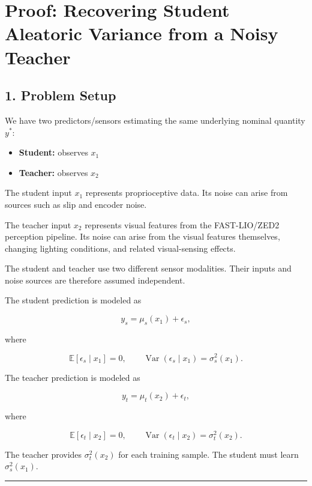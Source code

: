 \section{Proof: Recovering Student Aleatoric Variance from a Noisy
Teacher}\label{proof-recovering-student-aleatoric-variance-from-a-noisy-teacher}

\subsection{1. Problem Setup}\label{problem-setup}

We have two predictors/sensors estimating the same underlying nominal
quantity \(y^*\):

\begin{itemize}
\tightlist
\item
  \textbf{Student:} observes \(x_1\)
\item
  \textbf{Teacher:} observes \(x_2\)
\end{itemize}

The student input \(x_1\) represents proprioceptive data. Its noise can
arise from sources such as slip and encoder noise.

The teacher input \(x_2\) represents visual features from the
FAST-LIO/ZED2 perception pipeline. Its noise can arise from the visual
features themselves, changing lighting conditions, and related
visual-sensing effects.

The student and teacher use two different sensor modalities. Their
inputs and noise sources are therefore assumed independent.

The student prediction is modeled as

\[
y_s = \mu_s(x_1) + \epsilon_s,
\]

where

\[
\mathbb{E}[\epsilon_s\mid x_1]=0,
\qquad
\operatorname{Var}(\epsilon_s\mid x_1)=\sigma_s^2(x_1).
\]

The teacher prediction is modeled as

\[
y_t = \mu_t(x_2) + \epsilon_t,
\]

where

\[
\mathbb{E}[\epsilon_t\mid x_2]=0,
\qquad
\operatorname{Var}(\epsilon_t\mid x_2)=\sigma_t^2(x_2).
\]

The teacher provides \(\sigma_t^2(x_2)\) for each training sample. The
student must learn \(\sigma_s^2(x_1)\).

\begin{center}\rule{0.5\linewidth}{0.5pt}\end{center}

